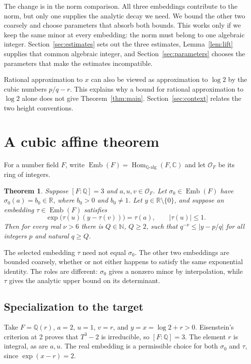 \documentclass[11pt]{article}
\newcommand{\R}{\mathbb R}
\newcommand{\Q}{\mathbb Q}
\newcommand{\C}{\mathbb C}
\newcommand{\N}{\mathbb N}
\newcommand{\OO}{\mathcal O}
\newcommand{\Emb}{\operatorname{Emb}}
\newtheorem{theorem}{Theorem}[section]
\theoremstyle{remark}
\begin{document}
The change is in the norm comparison. All three embeddings contribute
to the norm, but only one supplies the analytic decay we need. We bound
the other two coarsely and choose parameters that absorb both bounds.
This works only if we keep the same minor at every embedding: the norm
must belong to one algebraic integer. Section~\ref{sec:estimates}
sets out the three estimates, Lemma~\ref{lem:lift} supplies that common
algebraic integer, and Section~\ref{sec:parameters} chooses the
parameters that make the estimates incompatible.

Rational approximation to $x$ can also be viewed as approximation to
$\log2$ by the cubic numbers $p/q-r$. This explains why a bound for
rational approximation to $\log2$ alone does not give
Theorem~\ref{thm:main}. Section~\ref{sec:context} relates the two height
conventions.

\section{A cubic affine theorem}\label{sec:general}
For a number field $F$, write
$\Emb(F)=\operatorname{Hom}_{\Q\text{-alg}}(F,\C)$ and let
$\OO_F$ be its ring of integers.

\begin{theorem}\label{thm:general}
Suppose $[F:\Q]=3$ and $a,u,v\in\OO_F$. Let $\sigma_0\in\Emb(F)$
have $\sigma_0(a)=b_0\in\R$, where $b_0>0$ and $b_0\ne1$.
Let $y\in\R\setminus\{0\}$, and suppose an embedding
$\tau\in\Emb(F)$ satisfies
\begin{equation}\label{eq:compatible}
 \exp\bigl(\tau(u)(y-\tau(v))\bigr)=\tau(a),
 \qquad |\tau(u)|\le1.
\end{equation}
Then for every real $\nu>6$ there is $Q\in\N$, $Q\ge2$, such that
$q^{-\nu}\le|y-p/q|$ for all integers $p$ and natural $q\ge Q$.
\end{theorem}

The selected embedding $\tau$ need not equal $\sigma_0$. The other two
embeddings are bounded coarsely, whether or not either happens to
satisfy the same exponential identity. The roles are different:
$\sigma_0$ gives a nonzero minor by interpolation, while $\tau$ gives
the analytic upper bound on its determinant.

\subsection{Specialization to the target}
Take $F=\Q(r)$, $a=2$, $u=1$, $v=r$, and $y=x=\log2+r>0$.
Eisenstein's criterion at 2 proves that $T^3-2$ is irreducible, so
$[F:\Q]=3$. The element $r$ is integral, as are $a,u$.
The real embedding is a permissible choice for both $\sigma_0$ and
$\tau$, since $\exp(x-r)=2$.
\end{document}

